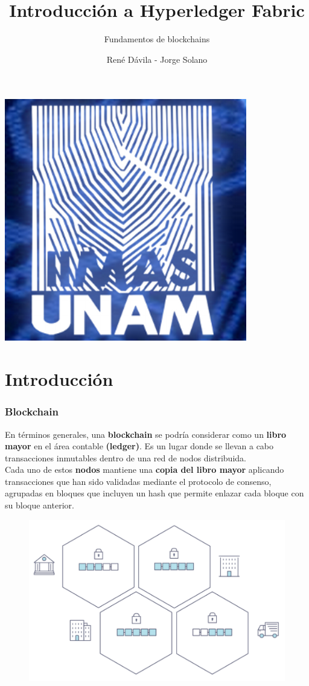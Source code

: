 \documentclass{beamer}
\title[]{Introducción a Hyperledger Fabric}
\subtitle{Fundamentos de blockchains}
\author{René Dávila - Jorge Solano}
\date{ }
\begin{document}
	\EnableBpAbbreviations
	
	\begin{frame}
		\begin{center}
			\includegraphics [width =0.2 \textwidth ]{iimas}
		\end{center}
		\titlepage 
	\end{frame}

	\section{Introducción}
	\begin{frame}
		\frametitle{Blockchain}
		En términos generales, una \textbf{blockchain} se podría considerar como un \textbf{libro mayor} en el área contable \textbf{(ledger)}. Es un lugar donde se llevan a cabo transacciones inmutables dentro de una red de nodos distribuida.\\
		\vspace{4mm}
		Cada uno de estos \textbf{nodos} mantiene una \textbf{copia del libro mayor} aplicando transacciones que han sido validadas mediante el protocolo de consenso, agrupadas en bloques que incluyen un hash que permite enlazar cada bloque con su bloque anterior.
		\begin{figure}[h]
			\includegraphics[scale=.4]{blockchain_figure}
			\centering
		\end{figure}
	\end{frame}
	
\end{document}

